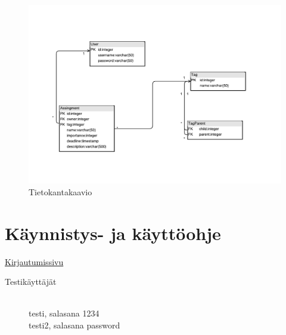 \documentclass[a4paper, 12pt, finnish]{article}
\begin{document}
\begin{figure}[h]
  \caption{Tietokantakaavio}
  \centering
  \includegraphics[scale=0.7]{tietokantakaavio}
\end{figure}

\newpage
\section{Käynnistys- ja käyttöohje}

\href{https://oraisa.users.cs.helsinki.fi/muistilista}{Kirjautumissivu} \\
\begin{description}
  \item[Testikäyttäjät] \hfill \\
  testi, salasana 1234 \\
  testi2, salasana password
\end{description}
\end{document}
